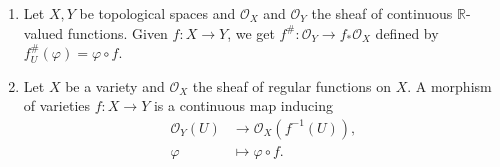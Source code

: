 \begin{enumerate}
	\item Let $X, Y$ be topological spaces and $\mathcal{O}_X$ and $\mathcal{O}_Y$
		the sheaf of continuous $\mathbb{R}$-valued functions. Given $f\colon X\to Y$,
		we get $f^\#\colon \mathcal{O}_Y\to f_*\mathcal{O}_X$ defined by
		$f_U^\#(\varphi) = \varphi \circ f$.
	\item Let $X$ be a variety and $\mathcal{O}_X$ the sheaf of regular functions
		on $X$. A morphism of varieties $f\colon X\to Y$ is a continuous map
		inducing
		\begin{align*}
			\mathcal{O}_Y(U) &\to \mathcal{O}_X(f^{-1}(U)),\\
			\varphi&\mapsto \varphi \circ f.
		\end{align*}
\end{enumerate}
